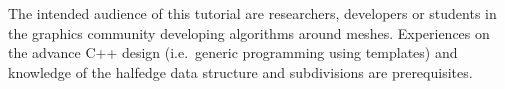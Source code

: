 \documentclass[letter]{article}
\begin{document}
The intended audience of this tutorial are researchers, 
developers or students in the graphics community developing 
algorithms around meshes. Experiences on the advance C++
design (i.e.\ generic programming using templates) and
knowledge of the halfedge data structure and 
subdivisions are prerequisites. 
\end{document}
